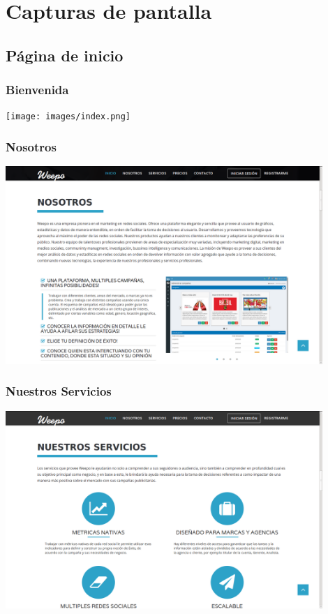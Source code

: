 \documentclass[oneside]{book}
\begin{document}
\section{Capturas de pantalla}



\subsection{P\'{a}gina de inicio}

\subsubsection{Bienvenida}
\medskip
\texttt{[image: images/index.png]}
\bigskip

\subsubsection{Nosotros}
\medskip
\includegraphics[width=0.9\textwidth]{images/nosotros.png}
\bigskip

\subsubsection{Nuestros Servicios}
\medskip

\includegraphics[width=0.9\textwidth]{images/servicios.png}
\bigskip
\end{document}

